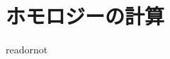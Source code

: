 \documentclass{jsarticle}
\begin{document}
\fi

\section{ホモロジーの計算}

\expandafter\ifx\csname readornot\endcsname\relax
  
\end{document}

